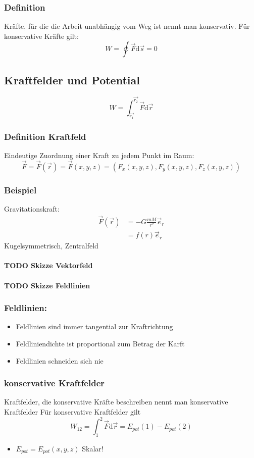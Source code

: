 \documentclass[a4paper]{scrartcl}
\renewcommand{\d}{\mathrm{d}}
\renewcommand{\v}[1]{\vec{#1}}
\begin{document}
\subsubsection{Definition}
\label{sec-9-8-1}
Kräfte, für die die Arbeit unabhängig vom Weg ist nennt man konservativ.
Für konservative Kräfte gilt:
\[W=\oint \v F\d \v s = 0\]
\subsection{Kraftfelder und Potential}
\label{sec-9-9}
\[W = \int_{\v{r_1}}^{\v{r_2}}\v F\d \v r\]
\subsubsection{Definition Kraftfeld}
\label{sec-9-9-1}
Eindeutige Zuordnung einer Kraft zu jedem Punkt im Raum:
\[\v F = \v F(\v r) = \v F(x,y,z) = (F_x(x,y,z),F_y(x,y,z),F_z(x,y,z))\]
\subsubsection{Beispiel}
\label{sec-9-9-2}
Gravitationskraft:
\begin{align}
\v F(\v r) &= -G\frac{m M}{r^2}\v e_r \\
&= f(r) \v e_r
\end{align}
Kugelsymmetrisch, Zentralfeld
\paragraph{{\bfseries\sffamily TODO} Skizze Vektorfeld}
\label{sec-9-9-2-1}
\paragraph{{\bfseries\sffamily TODO} Skizze Feldlinien}
\label{sec-9-9-2-2}
\subsubsection{Feldlinien:}
\label{sec-9-9-3}
\begin{itemize}
\item Feldlinien sind immer tangential zur Kraftrichtung
\item Feldliniendichte ist proportional zum Betrag der Karft
\item Feldlinien schneiden sich nie
\end{itemize}
\subsubsection{konservative Kraftfelder}
\label{sec-9-9-4}
Kraftfelder, die konservative Kräfte beschreiben nennt man konservative Kraftfelder
Für konservative Kraftfelder gilt
\[W_{12} = \int_1^2\v F\d\v r = E_{pot}(1) - E_{pot}(2)\]
\begin{itemize}
\item $E_{pot} = E_{pot}(x,y,z)$ Skalar!
\end{itemize}
\end{document}
